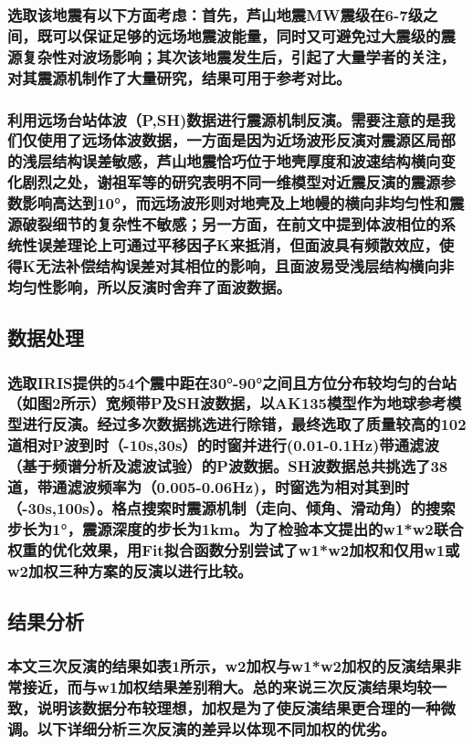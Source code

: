 \documentclass[a4paper,12pt,single,pdftex]{scrartcl}
\begin{document}
\label{ID_197380368}\subsubsection{选取该地震有以下方面考虑：首先，芦山地震MW震级在6-7级之间，既可以保证足够的远场地震波能量，同时又可避免过大震级的震源复杂性对波场影响；其次该地震发生后，引起了大量学者的关注，对其震源机制作了大量研究，结果可用于参考对比。}

\label{ID_465668819}\subsubsection{利用远场台站体波（P,SH)数据进行震源机制反演。需要注意的是我们仅使用了远场体波数据，一方面是因为近场波形反演对震源区局部的浅层结构误差敏感，芦山地震恰巧位于地壳厚度和波速结构横向变化剧烈之处，谢祖军等的研究表明不同一维模型对近震反演的震源参数影响高达到10°，而远场波形则对地壳及上地幔的横向非均匀性和震源破裂细节的复杂性不敏感；另一方面，在前文中提到体波相位的系统性误差理论上可通过平移因子K来抵消，但面波具有频散效应，使得K无法补偿结构误差对其相位的影响，且面波易受浅层结构横向非均匀性影响，所以反演时舍弃了面波数据。}

\label{ID_1181782570}\subsection{数据处理}

\label{ID_1085717567}\subsubsection{选取IRIS提供的54个震中距在30°-90°之间且方位分布较均匀的台站（如图2所示）宽频带P及SH波数据，以AK135模型\cite{Kennett1995}作为地球参考模型进行反演。经过多次数据挑选进行除错，最终选取了质量较高的102道相对P波到时（-10s,30s）的时窗并进行(0.01-0.1Hz)带通滤波（基于频谱分析及滤波试验）的P波数据。SH波数据总共挑选了38道，带通滤波频率为（0.005-0.06Hz)，时窗选为相对其到时（-30s,100s）。格点搜索时震源机制（走向、倾角、滑动角）的搜索步长为1°，震源深度的步长为1km。为了检验本文提出的w1*w2联合权重的优化效果，用Fit拟合函数分别尝试了w1*w2加权和仅用w1或w2加权三种方案的反演以进行比较。}

\label{ID_491927039}\subsection{结果分析}

\label{ID_1705787296}\subsubsection{本文三次反演的结果如表1所示，w2加权与w1*w2加权的反演结果非常接近，而与w1加权结果差别稍大。总的来说三次反演结果均较一致，说明该数据分布较理想，加权是为了使反演结果更合理的一种微调。以下详细分析三次反演的差异以体现不同加权的优劣。}
\end{document}
